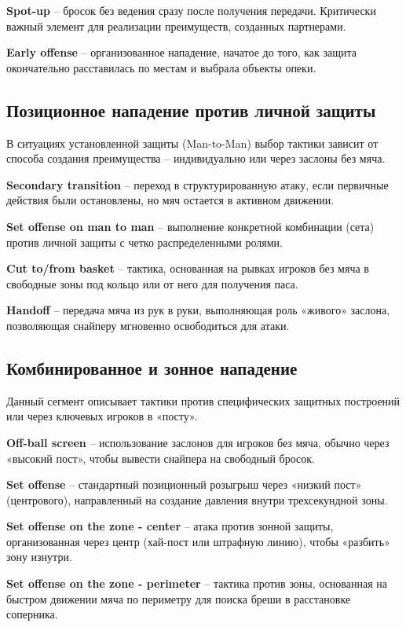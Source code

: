 \documentclass[a4paper, final]{article}
\begin{document}
\textbf{Spot-up} -- бросок без ведения сразу после получения передачи. Критически важный элемент для реализации преимуществ, созданных партнерами.

\textbf{Early offense} -- организованное нападение, начатое до того, как защита окончательно расставилась по местам и выбрала объекты опеки.

\subsection{Позиционное нападение против личной защиты}

В ситуациях установленной защиты (Man-to-Man) выбор тактики зависит от способа создания преимущества -- индивидуально или через заслоны без мяча.

\textbf{Secondary transition} -- переход в структурированную атаку, если первичные действия были остановлены, но мяч остается в активном движении.

\textbf{Set offense on man to man} -- выполнение конкретной комбинации (сета) против личной защиты с четко распределенными ролями.

\textbf{Cut to/from basket} -- тактика, основанная на рывках игроков без мяча в свободные зоны под кольцо или от него для получения паса.

\textbf{Handoff} -- передача мяча из рук в руки, выполняющая роль «живого» заслона, позволяющая снайперу мгновенно освободиться для атаки.

\subsection{Комбинированное и зонное нападение}

Данный сегмент описывает тактики против специфических защитных построений или через ключевых игроков в «посту».

\textbf{Off-ball screen} -- использование заслонов для игроков без мяча, обычно через «высокий пост», чтобы вывести снайпера на свободный бросок.

\textbf{Set offense} -- стандартный позиционный розыгрыш через «низкий пост» (центрового), направленный на создание давления внутри трехсекундной зоны.

\textbf{Set offense on the zone - center} -- атака против зонной защиты, организованная через центр (хай-пост или штрафную линию), чтобы «разбить» зону изнутри.

\textbf{Set offense on the zone - perimeter} -- тактика против зоны, основанная на быстром движении мяча по периметру для поиска бреши в расстановке соперника.
\end{document}
